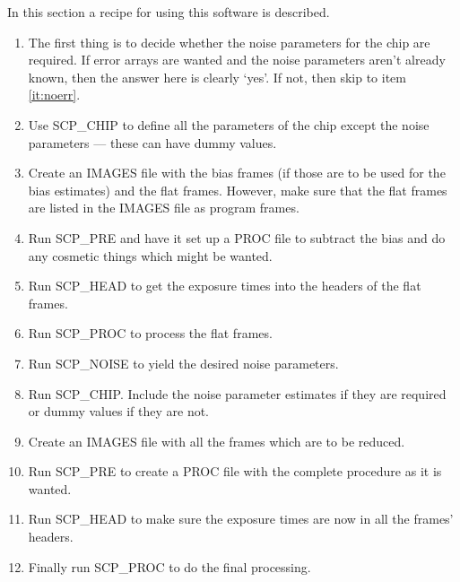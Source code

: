 In this section a recipe for using this software is described.  

\begin{enumerate}

\item The first thing is to decide whether the noise parameters for the chip
are required. If error arrays are wanted and the noise parameters aren't
already known, then the answer here is clearly `yes'. If not, then skip to
item \ref{it:noerr}.

\item Use SCP\_CHIP to define all the parameters of the chip except the noise
parameters --- these can have dummy values.  

\item Create an IMAGES file with the bias frames (if those are  to be used for
the bias estimates) and the flat frames. However, make sure that the flat
frames are listed in the IMAGES file as program frames.  

\item Run SCP\_PRE and have it set up a PROC file to subtract the bias and do
any cosmetic things which might be wanted.  

\item Run SCP\_HEAD to get the exposure times into the headers of the flat
frames.

\item Run SCP\_PROC to process the flat frames.

\item Run SCP\_NOISE to yield the desired noise parameters.

\item \label{it:noerr} Run SCP\_CHIP. Include the noise parameter estimates if
they are required or dummy values if they are not.

\item Create an IMAGES file with all the frames which are to be reduced.  

\item Run SCP\_PRE to create a PROC file with the complete procedure as  it is
wanted.

\item Run SCP\_HEAD to make sure the exposure times are now in all the
frames' headers.

\item Finally run SCP\_PROC to do the final processing.

\end{enumerate}


